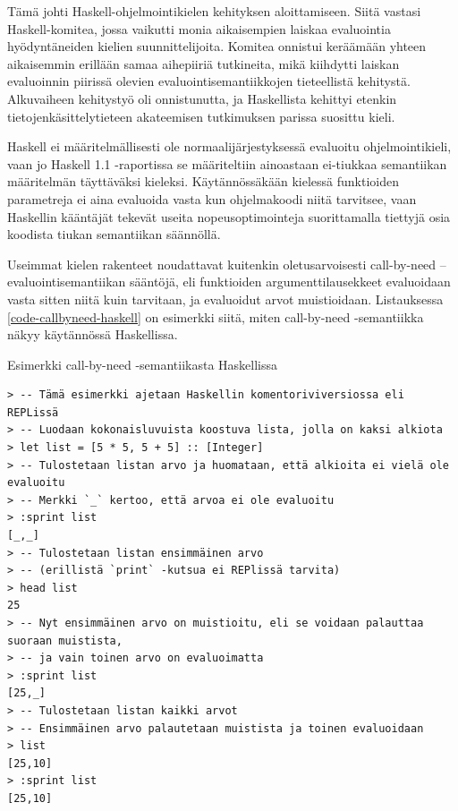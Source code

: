 Tämä johti Haskell-ohjelmointikielen kehityksen aloittamiseen. Siitä vastasi Haskell-komitea, jossa vaikutti monia aikaisempien laiskaa evaluointia hyödyntäneiden kielien suunnittelijoita. Komitea onnistui keräämään yhteen aikaisemmin erillään samaa aihepiiriä tutkineita, mikä kiihdytti laiskan evaluoinnin piirissä olevien evaluointisemantiikkojen tieteellistä kehitystä. Alkuvaiheen kehitystyö oli onnistunutta, ja Haskellista kehittyi etenkin tietojenkäsittelytieteen akateemisen tutkimuksen parissa suosittu kieli.

Haskell ei määritelmällisesti ole normaalijärjestyksessä evaluoitu ohjelmointikieli, vaan jo Haskell 1.1 -raportissa \citep{yale1991report} se määriteltiin ainoastaan ei-tiukkaa semantiikan määritelmän täyttäväksi kieleksi. Käytännössäkään kielessä funktioiden parametreja ei aina evaluoida vasta kun ohjelmakoodi niitä tarvitsee, vaan Haskellin kääntäjät tekevät useita nopeusoptimointeja suorittamalla tiettyjä osia koodista tiukan semantiikan säännöllä.

Useimmat kielen rakenteet noudattavat kuitenkin oletusarvoisesti call-by-need –evaluointisemantiikan sääntöjä, eli funktioiden argumenttilausekkeet evaluoidaan vasta sitten niitä kuin tarvitaan, ja evaluoidut arvot muistioidaan. Listauksessa \ref{code-callbyneed-haskell} on esimerkki siitä, miten call-by-need -semantiikka näkyy käytännössä Haskellissa.

\begin{listing}[H]
  \caption{Esimerkki call-by-need -semantiikasta Haskellissa}
  \label{code-callbyneed-haskell}
  \bigskip
  \begin{verbatim}
> -- Tämä esimerkki ajetaan Haskellin komentoriviversiossa eli REPLissä
> -- Luodaan kokonaisluvuista koostuva lista, jolla on kaksi alkiota
> let list = [5 * 5, 5 + 5] :: [Integer]
> -- Tulostetaan listan arvo ja huomataan, että alkioita ei vielä ole evaluoitu
> -- Merkki `_` kertoo, että arvoa ei ole evaluoitu
> :sprint list
[_,_]
> -- Tulostetaan listan ensimmäinen arvo
> -- (erillistä `print` -kutsua ei REPlissä tarvita)
> head list
25
> -- Nyt ensimmäinen arvo on muistioitu, eli se voidaan palauttaa suoraan muistista,
> -- ja vain toinen arvo on evaluoimatta
> :sprint list
[25,_]
> -- Tulostetaan listan kaikki arvot
> -- Ensimmäinen arvo palautetaan muistista ja toinen evaluoidaan
> list
[25,10]
> :sprint list
[25,10]
\end{verbatim}
\end{listing}

